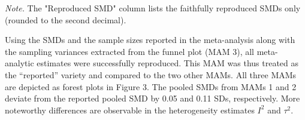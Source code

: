 \documentclass[
  man,floatsintext]{apa6}
\begin{document}
\endgroup{}
\vspace{-8mm}
\begin{tablenotes}
      \small
      \item \textit{Note.} The "Reproduced SMD" column lists the faithfully reproduced SMDs only (rounded to the second decimal).
    \end{tablenotes}
\doublespacing

Using the SMDs and the sample sizes reported in the meta-analysis along with the sampling variances extracted from the funnel plot (MAM 3), all meta-analytic estimates were successfully reproduced. This MAM was thus treated as the ``reported'' variety and compared to the two other MAMs. All three MAMs are depicted as forest plots in Figure 3. The pooled SMDs from MAMs 1 and 2 deviate from the reported pooled SMD by 0.05 and 0.11 SDs, respectively. More noteworthy differences are observable in the heterogeneity estimates \(I^2\) and \(\tau^2\).
\end{document}
